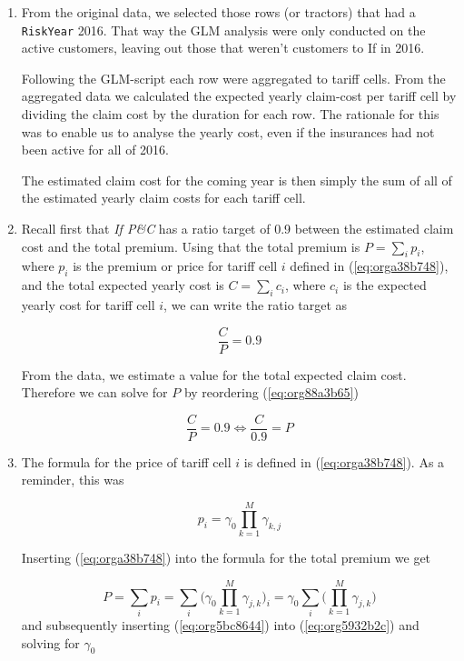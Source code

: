 \documentclass[11pt]{article}
\begin{document}
\begin{enumerate}
\item From the original data, we selected those rows (or tractors) that had a \texttt{RiskYear} 2016. That 
way the GLM analysis were only conducted on the active customers, leaving out those that weren't 
customers to If in 2016. 

Following the GLM-script each row were aggregated to tariff cells.
From the aggregated data we calculated the expected yearly claim-cost per tariff cell by dividing the
claim cost by the duration for each row. The rationale for this was to enable us to analyse the 
yearly cost, even if the insurances had not been active for all of 2016. 

The estimated claim cost for the coming year is then simply the sum of all of the estimated yearly 
claim costs for each tariff cell.

\item Recall first that \emph{If P\&C} has a ratio target of 0.9 between the estimated claim cost and the total premium.
Using that the total premium is \(P = \sum_i p_i\), where \(p_i\) is the premium or price for tariff cell \(i\) defined 
in (\ref{eq:orga38b748}), and the total expected yearly cost is \(C = \sum_i c_i\), where \(c_i\) is the expected yearly cost 
for tariff cell \(i\), we can write the ratio target as

\begin{equation}
\label{eq:org88a3b65}
  \frac{C}{P} = 0.9 
\end{equation}

From the data, we estimate a value for the total expected claim cost. Therefore we can solve for 
\(P\) by reordering (\ref{eq:org88a3b65})

\begin{equation}
\label{eq:org5932b2c}
\frac{C}{P} = 0.9 \iff \frac{C}{0.9} = P
\end{equation}

\item The formula for the price of tariff cell \(i\) is defined in (\ref{eq:orga38b748}). As a reminder, this was

\[
      p_i = \gamma_0 \prod_{k = 1}^M \gamma_{k,j}
      \]

Inserting (\ref{eq:orga38b748}) into the formula for the total premium we get

\begin{equation}
\label{eq:org5bc8644}
P = \sum_i p_i = \sum_i \bigg (\gamma_0 \prod_{k = 1}^M \gamma_{j,k} \bigg)_i =  \gamma_0 \sum_i \bigg ( \prod_{k = 1}^M \gamma_{j,k} \bigg)
\end{equation}
and subsequently inserting (\ref{eq:org5bc8644}) into (\ref{eq:org5932b2c}) and solving for \(\gamma_0\) 


\end{enumerate}
\end{document}
